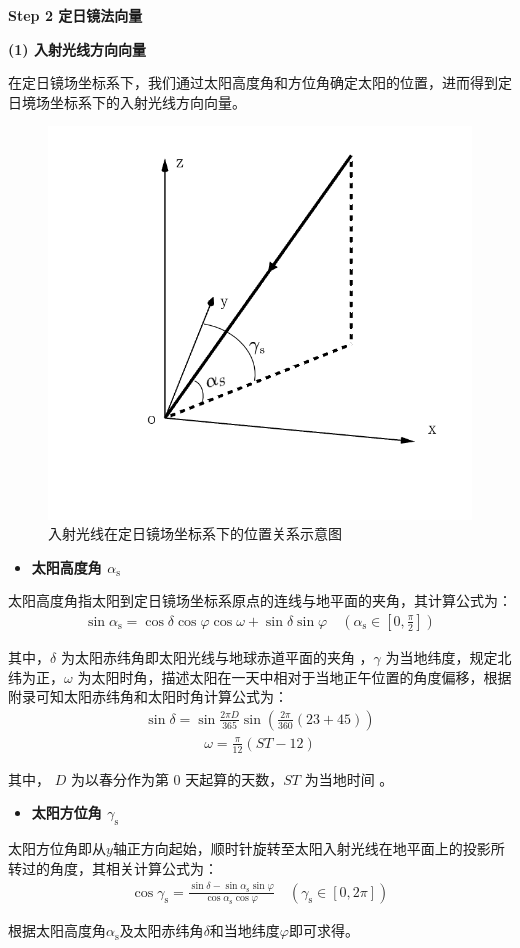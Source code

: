 \documentclass[../main.tex]{subfiles}
\begin{document}
  \noindent \textbf{Step 2 定日镜法向量}
\par \textbf{(1) 入射光线方向向量}
\par 在定日镜场坐标系下，我们通过太阳高度角和方位角确定太阳的位置，进而得到定日境场坐标系下的入射光线方向向量。
   \begin{figure}[H]
    \centering
    \includegraphics[width=.6\textwidth]{3}
    \caption{入射光线在定日镜场坐标系下的位置关系示意图}
    \label{1.2}
\end{figure} 
\begin{itemize}
  \item \textbf{太阳高度角 $\alpha_{\text{s}}$}
  \end{itemize}
  \par 太阳高度角指太阳到定日镜场坐标系原点的连线与地平面的夹角，其计算公式为：
\begin{align}    \label{1.4}
\sin \alpha _{\text{s}}=\cos \delta \cos \varphi \cos \omega +\sin \delta \sin \varphi \quad \left( \alpha _{\text{s}}\in \left[ 0,\frac{\pi}{2} \right] \right) 
\end{align}
\par 其中，$\delta$ 为太阳赤纬角即太阳光线与地球赤道平面的夹角 ，$\gamma$ 为当地纬度，规定北纬为正，$\omega$ 为太阳时角，描述太阳在一天中相对于当地正午位置的角度偏移，根据附录可知太阳赤纬角和太阳时角计算公式为：
\begin{align}    \label{1.5}
\sin\delta = \sin\frac{2\pi D}{365} \sin\left(\frac{2\pi}{360}(23 + 45)\right)
\end{align}
\begin{align}    \label{1.6}
\omega = \frac{\pi}{12}(ST - 12)
\end{align}
\par 其中， $D$ 为以春分作为第 0 天起算的天数，$ST$ 为当地时间 。
  \begin{itemize}
  \item \textbf{太阳方位角 $ \gamma _{\text{s}}$}
  \end{itemize}
  \par 太阳方位角即从$y$轴正方向起始，顺时针旋转至太阳入射光线在地平面上的投影所转过的角度，其相关计算公式为：
\begin{align}    \label{1.7}
\cos \gamma _{\text{s}}=\frac{\sin \delta -\sin \alpha _{\text{s}}\sin \varphi}{\cos \alpha _{\text{s}}\cos \varphi}\quad \left( \gamma _{\text{s}}\in \left[ 0,2\pi \right] \right) 
\end{align}
\par 根据太阳高度角$\alpha_{\text{s}}$及太阳赤纬角$\delta$和当地纬度$\varphi$即可求得。
\end{document}
